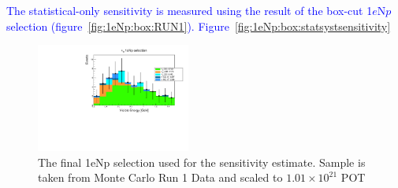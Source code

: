 \documentclass[a4paper]{article}
\begin{document}
\textcolor{blue}{The statistical-only sensitivity is measured using the result of the box-cut 1$e$N$p$ selection (figure~\ref{fig:1eNp:box:RUN1}). Figure~\ref{fig:1eNp:box:statsystsensitivity}}

\begin{commen}
\begin{figure}[H]
    \begin{center}
    \includegraphics[width=0.45\textwidth]{Sensitivity/nue_reco_e_genietune_run1_nueStacked.pdf}
    \caption{\label{fig:1eNp:box:sensitivitysample} The final 1eNp selection used for the sensitivity estimate. Sample is taken from Monte Carlo Run 1 Data and scaled to $1.01\times10^{21}$ POT}
    \end{center}
\end{figure}
\end{commen}{}
\end{document}
